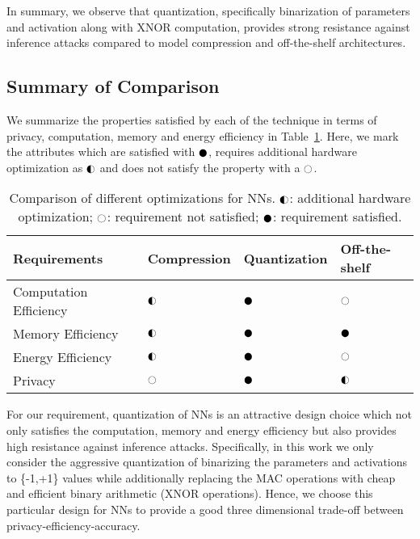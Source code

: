 In summary, we observe that quantization, specifically binarization of parameters and activation along with XNOR computation, provides strong resistance against inference attacks compared to model compression and off-the-shelf architectures.

\subsection{Summary of Comparison}

We summarize the properties satisfied by each of the technique in terms of privacy, computation, memory and energy efficiency in Table~\ref{tbl:comparison}.
Here, we mark the attributes which are satisfied with $\cmark$, requires additional hardware optimization as $\smark$ and does not satisfy the property with a $\xmark$.

\begin{table}[!htb]
\begin{center}
\renewcommand\arraystretch{1.5}
\fontsize{6.7pt}{6.7pt}\selectfont
\begin{tabular}{|l||l|l|l|}
\hline
Requirements & Compression & Quantization & Off-the-shelf  \\
\hline
Computation Efficiency & $\smark$  & $\cmark$   & $\xmark$ \\
\hline
Memory Efficiency &  $\smark$ & $\cmark$   & $\cmark$ \\
\hline
Energy Efficiency &  $\smark$   & $\cmark$   & $\xmark$ \\
\hline
Privacy &  $\xmark$   & $\cmark$   & $\smark$ \\
\hline
\end{tabular}
\end{center}
\caption{Comparison of different optimizations for NNs. $\smark$: additional hardware optimization; $\xmark$: requirement not satisfied; $\cmark$: requirement satisfied.}
\label{tbl:comparison}
\end{table}

For our requirement, quantization of NNs is an attractive design choice which not only satisfies the computation, memory and energy efficiency but also provides high resistance against inference attacks.
Specifically, in this work we only consider the aggressive quantization of binarizing the parameters and activations to \{-1,+1\} values while additionally replacing the MAC operations with cheap and efficient binary arithmetic (XNOR operations).
Hence, we choose this particular design for NNs to provide a good three dimensional trade-off between privacy-efficiency-accuracy.
